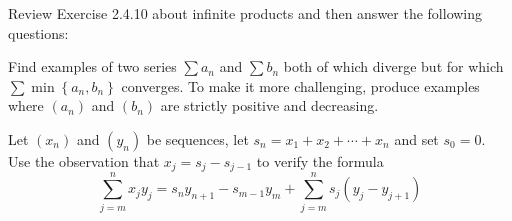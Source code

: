 \begin{solution}
  \enum{
  \item \TODO
  \item \TODO
  \item \TODO
  }
\end{solution}

\begin{exercise}
  Review Exercise 2.4.10 about infinite products and then answer the following questions:
\end{exercise}

\begin{solution}
  \enum{
  \item \TODO
  \item \TODO
  \item \TODO
  }
\end{solution}

\begin{exercise}
  Find examples of two series $\sum a_{n}$ and $\sum b_{n}$ both of which diverge but for which $\sum \min \left\{a_{n}, b_{n}\right\}$ converges. To make it more challenging, produce examples where $\left(a_{n}\right)$ and $\left(b_{n}\right)$ are strictly positive and decreasing.
\end{exercise}

\begin{solution}
  \TODO
\end{solution}

\begin{exercise}
  Let $\left(x_{n}\right)$ and $\left(y_{n}\right)$ be sequences, let $s_{n}=x_{1}+x_{2}+\cdots+x_{n}$ and set $s_{0}=0 .$ Use the observation that $x_{j}=s_{j}-s_{j-1}$ to verify the formula
  $$
  \sum_{j=m}^{n} x_{j} y_{j}=s_{n} y_{n+1}-s_{m-1} y_{m}+\sum_{j=m}^{n} s_{j}\left(y_{j}-y_{j+1}\right)
  $$
\end{exercise}

